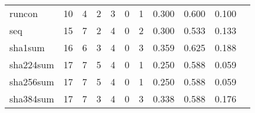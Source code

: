 \begin{longtable}{lp{1.20cm}p{1.20cm}p{1.20cm}p{1.20cm}p{1.20cm}p{1.20cm}p{1.20cm}p{1.20cm}p{1.20cm}p{1.20cm}}
runcon    &                                    10 &                                                  4 &                                                  2 &                                                  3 &                                                  0 &                                                  1 &                                         0.300 &                                              0.600 &                                              0.100 \\
seq       &                                    15 &                                                  7 &                                                  2 &                                                  4 &                                                  0 &                                                  2 &                                         0.300 &                                              0.533 &                                              0.133 \\
sha1sum   &                                    16 &                                                  6 &                                                  3 &                                                  4 &                                                  0 &                                                  3 &                                         0.359 &                                              0.625 &                                              0.188 \\
sha224sum &                                    17 &                                                  7 &                                                  5 &                                                  4 &                                                  0 &                                                  1 &                                         0.250 &                                              0.588 &                                              0.059 \\
sha256sum &                                    17 &                                                  7 &                                                  5 &                                                  4 &                                                  0 &                                                  1 &                                         0.250 &                                              0.588 &                                              0.059 \\
sha384sum &                                    17 &                                                  7 &                                                  3 &                                                  4 &                                                  0 &                                                  3 &                                         0.338 &                                              0.588 &                                              0.176 \\

\end{longtable}
